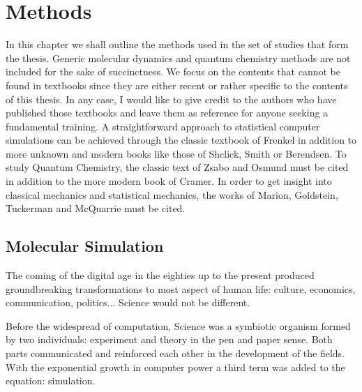 \chapter[Methods]{Methods}\label{c2:Methods}
In this chapter we shall outline the methods used in the set of studies that form the thesis. 
Generic 
molecular dynamics and quantum chemistry methods are not included for the sake of succinctness. 
We focus on the contents that cannot be found in textbooks since they are either recent or 
rather specific to the contents of this thesis. In any case, I would like to give credit to 
the authors who have published those textbooks and leave them as reference for anyone seeking 
a fundamental training. A straightforward approach to statistical computer simulations can be 
achieved through the classic textbook of 
Frenkel\cite{frenkel2001understanding} in addition to more unknown and modern books like 
those of Shclick\cite{Shclick2013}, Smith\cite{Smith2014} or 
Berendsen\cite{HermanJ.C.Berendsen2007_v2}. To study Quantum Chemistry, the 
classic text of 
Zsabo and Osmund\cite{szabo2012modern} must be cited in addition to the more modern book of 
Cramer\cite{Cramer2004_v2}. In order to get insight into classical mechanics and statistical 
mechanics, the works of Marion\cite{Jefferys1966}, Goldstein\cite{Goldstein}, 
Tuckerman\cite{tuckerman2010statistical} and McQuarrie\cite{mcquarrie1973statistical} must be cited.

\section{Molecular Simulation}\label{sec:molecularsimulation}
The coming of the digital age in the eighties up to the present produced 
groundbreaking transformations to most aspect of human life: culture, economics, 
communication, politics... Science would not be different. 

Before the widespread of computation, Science was a 
symbiotic organism formed by two 
individuals: experiment and theory in the pen and paper sense. Both parts communicated and 
reinforced each other in the development of the fields. With the exponential growth in 
computer power a third term was added to the equation: simulation. 

